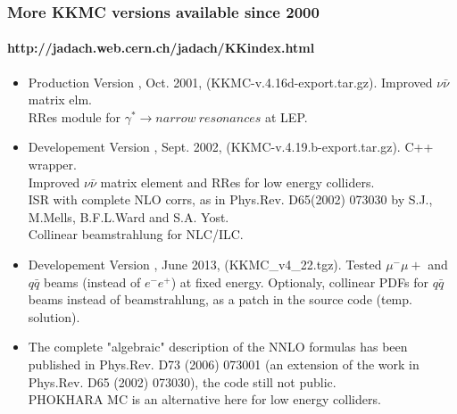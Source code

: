 \documentclass{beamer}
\newcommand{\cbl}{\color{blue}}
\newcommand{\cmg}{\color{magenta}}
\begin{document}
\begin{frame}[fragile]
\frametitle{\bf More KKMC versions available since 2000}
\framesubtitle{http://jadach.web.cern.ch/jadach/KKindex.html}
\small
\begin{itemize}
\item
Production Version \fbox{\cmg 4.16}, Oct. 2001,  
(KKMC-v.4.16d-export.tar.gz).
Improved $\nu\bar{\nu}$ matrix elm.\\
RRes module for $\gamma^* \to narrow~resonances$ at LEP.
\item
Developement Version \fbox{\cmg 4.19}, Sept. 2002,  
(KKMC-v.4.19.b-export.tar.gz). C++ wrapper.\\
Improved $\nu\bar{\nu}$ matrix element and RRes for low energy colliders.\\
ISR with complete NLO corrs,
as in Phys.Rev. D65(2002) 073030 by S.J., M.Mells, B.F.L.Ward and S.A. Yost.\\
Collinear beamstrahlung for NLC/ILC.
\item
{\cbl
Developement Version \fbox{\cmg 4.22}, June 2013,  
(KKMC\_v4\_22.tgz).
Tested $\mu^-\mu+$ and $q\bar{q}$ beams
(instead of $e^-e^+$) at fixed energy.
Optionaly, collinear PDFs for $q\bar{q}$ beams instead of beamstrahlung,
as a patch in the source code (temp. solution).}
\item
{\footnotesize
The complete "algebraic" description of the NNLO formulas has been
published in Phys.Rev. D73 (2006) 073001
(an extension of the work in Phys.Rev. D65 (2002) 073030),
the code still not public.\\
PHOKHARA MC is an alternative here for low energy colliders.}
\end{itemize}

\end{frame}
\end{document}
